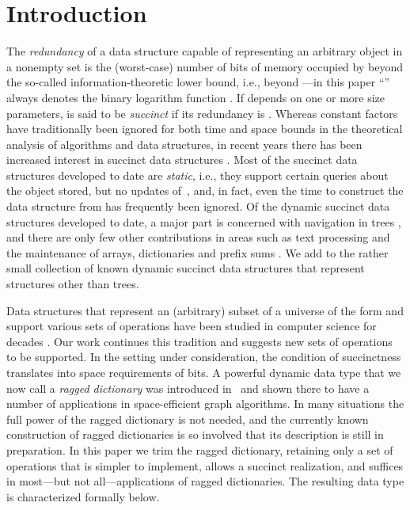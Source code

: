 \documentclass[envcountsame,envcountsect,undated,nolinenumbers]{lnthi}
\begin{document}
\pagestyle{plain}
\thispagestyle{plain}

\section{Introduction}
\label{sec:intro}The \emph{redundancy} of
a data structure  capable of representing an arbitrary
object in a nonempty set 
is the (worst-case) number of bits
of memory occupied by  beyond
the so-called in\-for\-ma\-tion-theoretic lower bound,
i.e., beyond
---in this paper
``'' always denotes the
binary logarithm function .
If  depends on one or more size
parameters,  is said to be \emph{succinct}
if its redundancy is .
Whereas constant factors have traditionally been ignored
for both time and space bounds in the theoretical
analysis of algorithms and data structures,
in recent years there has been increased
interest in succinct data
structures \cite{BarAHM12,BroM99,Cla96,FerMM09,GeaRRR06,GolGGRR07,Jac89,MunRRR12,Pag01,Pat08,RamRS07}.
Most of the succinct data structures
developed to date are \emph{static}, i.e., they support
certain queries about the object  stored,
but no updates of~, and, in fact, even the time
to construct the data structure from  has
frequently been ignored.
Of the dynamic succinct data structures developed
to date, a major part is
concerned with navigation in trees
\cite{Arr08,DavR11,FarM11,MunRS01,NavS14,RamR03},
and there are only few other contributions in
areas such as text processing
\cite{HeM10,LeeP09,MakN08,RusNO11}
and the maintenance of arrays, dictionaries and prefix sums
\cite{BroCDMS99,GupHSV07b,RamRR01}.
We add to the rather small collection of
known dynamic succinct data structures
that represent structures other than trees.

Data structures that represent an
(arbitrary) subset  of a universe
of the form  and support various
sets of operations
have been studied in computer science for decades
\cite{Ajt88,AjtFK84,AndT07,BeaF02,BosDDHM13,DieKMHRT94,BoaKZ77,FiaN93,FreKS84,FreS89,FreW93,GupHSV07a,Joh82,PatT14,Ram96,Ruz08,TarY79,Tho00b,Wil84,Yao81}.
Our work continues this tradition and suggests
new sets of operations to be supported.
In the setting under consideration,
the condition of succinctness translates into space requirements
of  bits.
A powerful dynamic data type that we now call a
\emph{ragged dictionary}
was introduced in~\cite{ElmHK15}
and shown there to have a number of applications in
space-efficient graph algorithms.
In many situations the full power of the ragged
dictionary is not needed,
and the currently known construction of
ragged dictionaries is so involved that its
description is still in preparation.
In this paper we trim the ragged dictionary,
retaining only a set of operations that is simpler to
implement, allows a succinct realization,
and suffices in
most---but not all---applications of ragged dictionaries.
The resulting data type is characterized formally below.
\end{document}
